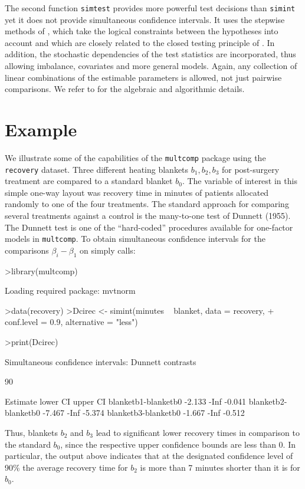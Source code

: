 \documentclass{article}
\begin{document}
The second function \texttt{simtest} provides more powerful test
decisions than \texttt{simint} yet it does not provide
simultaneous confidence intervals. It uses the stepwise methods of
\cite{westfall:1997}, which take the logical constraints between the
hypotheses into account and which are closely related to the
closed testing principle of \cite{Marcusetal:1976}. In addition, the
stochastic dependencies of the test statistics are incorporated,
thus allowing imbalance, covariates and more general models.
Again, any collection of linear combinations of the estimable
parameters is allowed, not just pairwise comparisons. We refer to
\cite{westfall:1997} for the algebraic and algorithmic details.

\section{Example}

We illustrate some of the capabilities of the \texttt{multcomp}
package using the \texttt{recovery} dataset. Three
different heating blankets $b_1, b_2, b_3$ for post-surgery
treatment are compared to a standard blanket $b_0$. The variable
of interest in this simple one-way layout was recovery time in
minutes of patients allocated randomly to one of the four
treatments. The standard approach for comparing several treatments
against a control is the many-to-one test of Dunnett (1955). The
Dunnett test is one of the ``hard-coded'' procedures available for
one-factor models in \texttt{multcomp}. To obtain simultaneous
confidence intervals for the comparisons $\beta_i - \beta_1$ on
simply calls:
\small
\begin{Sinput}
>library(multcomp)
\end{Sinput}
\begin{Soutput}
Loading required package: mvtnorm 
\end{Soutput}
\begin{Sinput}
>data(recovery)
>Dcirec <- simint(minutes ~ blanket, data = recovery, 
+     conf.level = 0.9, alternative = "less")
\end{Sinput}
\begin{Sinput}
>print(Dcirec)
\end{Sinput}
\begin{Soutput}
	Simultaneous confidence intervals: Dunnett
	contrasts

	90 % confidence intervals

                    Estimate lower CI upper CI
blanketb1-blanketb0   -2.133     -Inf   -0.041
blanketb2-blanketb0   -7.467     -Inf   -5.374
blanketb3-blanketb0   -1.667     -Inf   -0.512
\end{Soutput}
\normalsize
Thus, blankets $b_2$ and $b_3$ lead to significant lower recovery
times in comparison to the standard $b_0$, since the respective
upper confidence bounds are less than 0. In particular, the output
above indicates that at the designated confidence level of 90\%
the average recovery time for $b_2$ is more than 7 minutes shorter
than it is for $b_0$.
\end{document}
